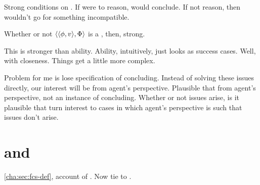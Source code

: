 {
  \color{red}
  Strong conditions on .
  If were to reason, would conclude.
  If not reason, then wouldn't go for something incompatible.

  Whether or not \(\langle \langle \phi, v \rangle, \Phi \rangle\) is a \fc{}, then, strong.

  This is stronger than ability.
  Ability, intuitively, just looks as success cases.
  Well, with closeness.
  Things get a little more complex.

  Problem for me is lose specification of concluding.
  Instead of solving these issues directly, our interest will be from agent's perspective.
  Plausible that from agent's perspective, not an instance of concluding.
  Whether or not issues arise, is it plausible that turn interest to cases in which agent's perspective is such that issues don't arise.
}

\section{ and }
\label{cha:fcs:sec:fcs-support}

\begin{note}
  \autoref{cha:sec:fcs-def}, account of .
  Now tie to .
\end{note}

